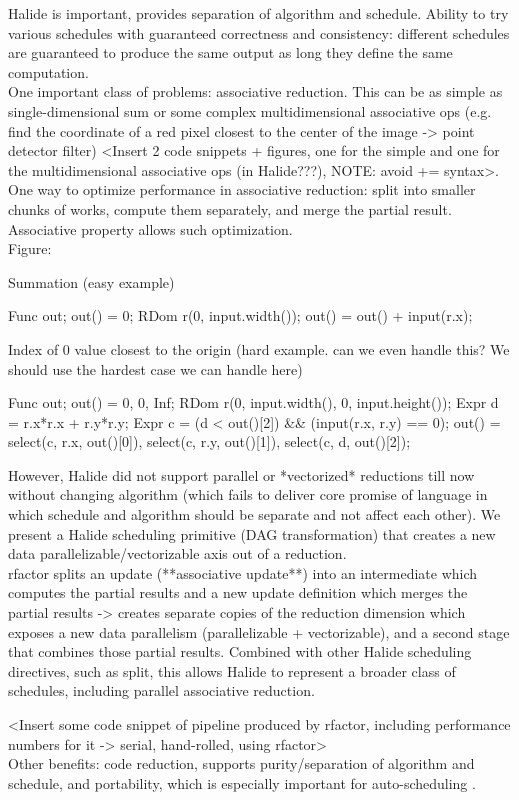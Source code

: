 Halide \cite{Ragan-Kelley:2013:HLC:2491956.2462176} is important, provides separation of algorithm and schedule. Ability to try various schedules with guaranteed correctness and consistency: different schedules are guaranteed to produce the same output as long they define the same computation. \\

One important class of problems: associative reduction. This can be as simple as single-dimensional sum or some complex multidimensional associative ops (e.g. find the coordinate of a red pixel closest to the center of the image -> point detector filter) <Insert 2 code snippets + figures, one for the simple and one for the multidimensional associative ops (in Halide???), NOTE: avoid += syntax>. One way to optimize performance in associative reduction: split into smaller chunks of works, compute them separately, and merge the partial result. Associative property allows such optimization. \\

Figure:

Summation (easy example)

Func out;
out() = 0;
RDom r(0, input.width());
out() = out() + input(r.x);

Index of 0 value closest to the origin (hard example. can we even handle this? We should use the hardest case we can handle here)

Func out;
out() = {0, 0, Inf};
RDom r(0, input.width(), 0, input.height());
Expr d = r.x*r.x + r.y*r.y;
Expr c = (d < out()[2]) && (input(r.x, r.y) == 0);
out() = {select(c, r.x, out()[0]),
         select(c, r.y, out()[1]),
         select(c, d, out()[2])};


However, Halide did not support parallel or *vectorized* reductions till now without changing algorithm (which fails to deliver core promise of language in which schedule and algorithm should be separate and not affect each other). We present a Halide scheduling primitive (DAG transformation) that creates a new data parallelizable/vectorizable axis out of a reduction. \\

rfactor splits an update (**associative update**) into an intermediate which computes the partial results and a new update definition which merges the partial results -> creates separate copies of the reduction dimension which exposes a new data parallelism (parallelizable + vectorizable), and a second stage that combines those partial results. Combined with other Halide scheduling directives, such as split, this allows Halide to represent a broader class of schedules, including parallel associative reduction. 

<Insert some code snippet of pipeline produced by rfactor, including performance numbers for it -> serial, hand-rolled, using rfactor> \\

Other benefits: code reduction, supports purity/separation of algorithm and schedule, and portability, which is especially important for auto-scheduling \cite{Mullapudi:2016:ASH:2897824.2925952}. \\
